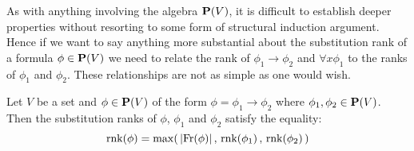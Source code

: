 As with anything involving the algebra $\mbox{${\bf P}(V)$}$, it is difficult to
establish deeper properties without resorting to some form of
structural induction argument. Hence if we want to say anything more
substantial about the substitution rank of a formula $\phi\in\mbox{${\bf P}(V)$}$ we
need to relate the rank of $\phi_{1}\to\phi_{2}$ and $\forall
x\phi_{1}$ to the ranks of $\phi_{1}$ and $\phi_{2}$. These
relationships are not as simple as one would wish.

\begin{prop}\label{logic:prop:FOPL:substrank:impl}
Let $V$ be a set and $\phi\in\mbox{${\bf P}(V)$}$ of the form
$\phi=\phi_{1}\to\phi_{2}$ where $\phi_{1},\phi_{2}\in\mbox{${\bf P}(V)$}$. Then the
substitution ranks of $\phi$, $\phi_{1}$ and $\phi_{2}$ satisfy the
equality:
    \[
    \mbox{\rm rnk}(\phi)=\max(\,|\mbox{\rm Fr}(\phi)|\,,\,\mbox{\rm rnk}(\phi_{1})\,,\,\mbox{\rm rnk}(\phi_{2})\,)
    \]
\end{prop}
